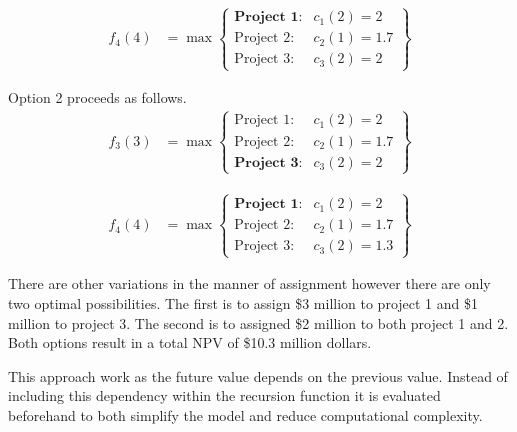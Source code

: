 \documentclass[a4paper,11pt]{article}
\begin{document}
\begin{align}
	f_4(4) &= \max 
	\begin{Bmatrix}
		\textbf{Project 1}: & c_1(2) = 2 \\
		\text{Project 2}: & c_2(1) =1.7 \\
		\text{Project 3}: & c_3(2) =2
	\end{Bmatrix}
\end{align}	

Option 2 proceeds as follows.
\begin{align}
	f_3(3) &= \max 
	\begin{Bmatrix}
		\text{Project 1}: & c_1(2) = 2 \\
		\text{Project 2}: & c_2(1) =1.7 \\
		\textbf{Project 3}: & c_3(2) =2
	\end{Bmatrix}
\end{align}	

\begin{align}
	f_4(4) &= \max 
	\begin{Bmatrix}
		\textbf{Project 1}: & c_1(2) = 2 \\
		\text{Project 2}: & c_2(1) =1.7 \\
		\text{Project 3}: & c_3(2) =1.3
	\end{Bmatrix}
\end{align}	

There are other variations in the manner of assignment however there are only two optimal possibilities. The first is to assign \$3 million to project 1 and \$1 million to project 3. The second is to assigned \$2 million to both project 1 and 2. Both options result in a total NPV of \$10.3 million dollars. 

This approach work as the future value depends on the previous value. Instead of including this dependency within the recursion function it is evaluated beforehand to both simplify the model and reduce computational complexity.
\end{document}
